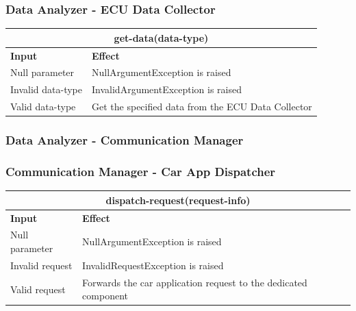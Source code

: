 \documentclass{article}
\begin{document}
\subsubsection{Data Analyzer - ECU Data Collector}
\begin{tabular}{ |p{5cm}|p{7cm}| }
  \hline
  \multicolumn{2}{|c|}{get-data(data-type)} \\
  \hline
  \textbf{Input} & \textbf{Effect} \\
  \hline
  Null parameter & NullArgumentException is raised\\
  \hline
  Invalid data-type & InvalidArgumentException is raised\\
  \hline
   Valid data-type & Get the specified data from the ECU Data Collector\\
  \hline
\end{tabular}
\subsubsection{Data Analyzer - Communication Manager}
\subsubsection{Communication Manager - Car App Dispatcher}
\begin{tabular}{ |p{5cm}|p{7cm}| }
  \hline
  \multicolumn{2}{|c|}{dispatch-request(request-info)} \\
  \hline
  \textbf{Input} & \textbf{Effect} \\
  \hline
  Null parameter & NullArgumentException is raised\\
  \hline
  Invalid request & InvalidRequestException is raised \\
  \hline
  Valid request & Forwards the car application request to the dedicated component\\
  \hline
\end{tabular}
\end{document}
